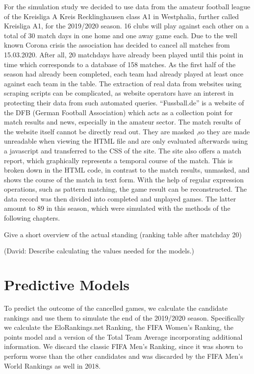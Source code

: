\documentclass[12pt,a4paper]{article}
\begin{document}
For the simulation study we decided to use data from the amateur
football league of the Kreisliga A Kreis Recklinghausen class A1 in
Westphalia, further called Kreisliga A1, for the 2019/2020 season. 16
clubs will play against each other on a total of 30 match days in one
home and one away game each. Due to the well known Corona crisis the
association has decided to cancel all matches from 15.03.2020. After
all, 20 matchdays have already been played until this point in time
which corresponds to a database of 158 matches. As the first half of the
season had already been completed, each team had already played at least
once against each team in the table. The extraction of real data from
websites using scraping scripts can be complicated, as website operators
have an interest in protecting their data from such automated queries.
\enquote{Fussball.de} is a website of the DFB (German Football
Association) which acts as a collection point for match results and
news, especially in the amateur sector. The match results of the website
itself cannot be directly read out. They are masked ,so they are made
unreadable when viewing the HTML file and are only evaluated afterwards
using a javascript and transferred to the CSS of the site. The site also
offers a match report, which graphically represents a temporal course of
the match. This is broken down in the HTML code, in contrast to the
match results, unmasked, and shows the course of the match in text form.
With the help of regular expression operations, such as pattern
matching, the game result can be reconstructed. The data record was then
divided into completed and unplayed games. The latter amount to 89 in
this season, which were simulated with the methods of the following
chapters.

Give a short overview of the actual standing (ranking table after
matchday 20)

(David: Describe calculating the values needed for the models.)

\hypertarget{predictive-models}{%
\section{Predictive Models}\label{predictive-models}}

To predict the outcome of the cancelled games, we calculate the
candidate rankings and use them to simulate the end of the 2019/2020
season. Specifically we calculate the EloRankings.net Ranking, the FIFA
Women's Ranking, the points model and a version of the Total Team
Average incorporating additional information. We discard the classic
FIFA Men's Ranking, since it was shown to perform worse than the other
candidates and was discarded by the FIFA Men's World Rankings as well in
2018.
\end{document}
